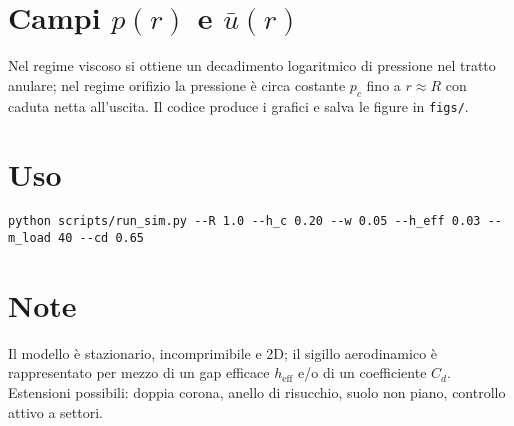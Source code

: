 \documentclass[11pt,a4paper]{article}
\begin{document}
\section{Campi $p(r)$ e $\bar u(r)$}
Nel regime viscoso si ottiene un decadimento logaritmico di pressione nel tratto anulare; nel regime orifizio la pressione è circa costante $p_c$ fino a $r \approx R$ con caduta netta all'uscita. Il codice produce i grafici e salva le figure in \texttt{figs/}.

\section{Uso}
\begin{verbatim}
python scripts/run_sim.py --R 1.0 --h_c 0.20 --w 0.05 --h_eff 0.03 --m_load 40 --cd 0.65
\end{verbatim}

\section{Note}
Il modello è stazionario, incomprimibile e 2D; il sigillo aerodinamico è rappresentato per mezzo di un gap efficace $h_{\mathrm{eff}}$ e/o di un coefficiente $C_d$. Estensioni possibili: doppia corona, anello di risucchio, suolo non piano, controllo attivo a settori.



\end{document}
